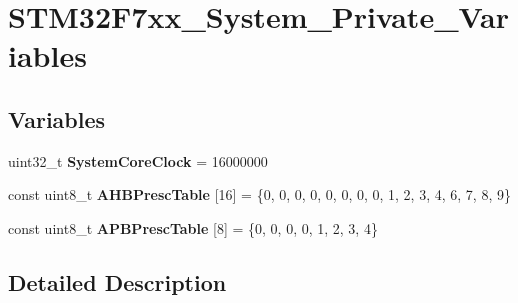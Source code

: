 \hypertarget{group__STM32F7xx__System__Private__Variables}{}\section{S\+T\+M32\+F7xx\+\_\+\+System\+\_\+\+Private\+\_\+\+Variables}
\label{group__STM32F7xx__System__Private__Variables}
\subsection*{Variables}
\begin{DoxyCompactItemize}
\item 
\mbox{\label{group__STM32F7xx__System__Private__Variables_gaa3cd3e43291e81e795d642b79b6088e6}} 
uint32\+\_\+t {\bfseries System\+Core\+Clock} = 16000000
\item 
\mbox{\label{group__STM32F7xx__System__Private__Variables_ga6e1d9cd666f0eacbfde31e9932a93466}} 
const uint8\+\_\+t {\bfseries A\+H\+B\+Presc\+Table} \mbox{[}16\mbox{]} = \{0, 0, 0, 0, 0, 0, 0, 0, 1, 2, 3, 4, 6, 7, 8, 9\}
\item 
\mbox{\label{group__STM32F7xx__System__Private__Variables_ga5b4f8b768465842cf854a8f993b375e9}} 
const uint8\+\_\+t {\bfseries A\+P\+B\+Presc\+Table} \mbox{[}8\mbox{]} = \{0, 0, 0, 0, 1, 2, 3, 4\}
\end{DoxyCompactItemize}


\subsection{Detailed Description}
